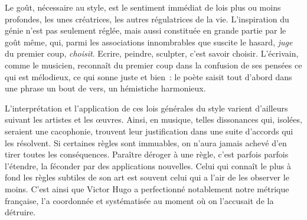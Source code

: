 \documentclass[french,twoside]{book} %
\begin{document}
Le goût, nécessaire au style, est le sentiment immédiat de lois plus ou moins profondes, les unes créatrices, les autres régulatrices de la vie. L’inspiration du génie n’est pas seulement réglée, mais aussi constituée en grande partie par le goût même, qui, parmi les associations innombrables que suscite le hasard, \emph{juge} du premier coup, \emph{choisit}. Ecrire, peindre, sculpter, c’est savoir choisir. L’écrivain, comme le musicien, reconnaît du premier coup dans la confusion de ses pensées ce qui est mélodieux, ce qui sonne juste et bien : le poète saisit tout d’abord dans une phrase un bout de vers, un hémistiche harmonieux.\par
L’interprétation et l’application de ces lois générales du style varient d’ailleurs suivant les artistes et les œuvres. Ainsi, en musique, telles dissonances qui, isolées, seraient une cacophonie, trouvent leur justification dans une suite d’accords qui les résolvent. Si certaines règles sont immuables, on n’aura jamais achevé d’en tirer toutes les conséquences. Paraître déroger à une règle, c’est parfois parfois l’étendre, la féconder par des applications nouvelles. Celui qui connaît le plus à fond les règles subtiles de son art est souvent celui qui a l’air de les observer le moins. C’est ainsi que Victor Hugo a perfectionné notablement notre métrique française, l’a coordonnée et systématisée au moment où on l’accusait de la détruire.\par
\end{document}
